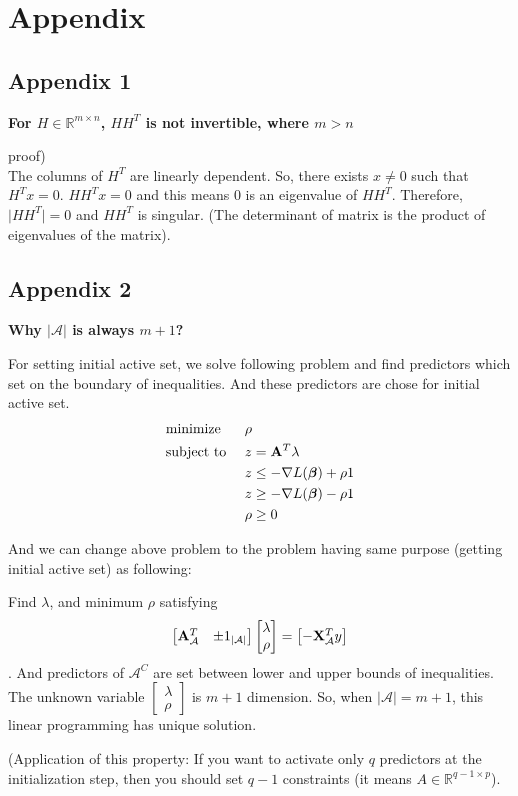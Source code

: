 \documentclass{article}
\newcommand{\bA}{{\bf A}}
\newcommand{\bX}{{\bf X}}
\newcommand{\bbeta}{\mbox{\boldmath{$\beta$}}}
\newcommand{\bean}{\begin{eqnarray*}}
\newcommand{\eean}{\end{eqnarray*}}
\newcommand{\bea}{\begin{eqnarray}}
\newcommand{\eea}{\end{eqnarray}}
\begin{document}
\section{Appendix}
\subsection{Appendix 1}
\textbf{For $H \in \mathbb{R}^{m \times n}$, $H H^T$ is not invertible, where $m > n$}

\medskip
proof) \\
The columns of $H^T$ are linearly dependent. 
So, there exists $x \neq 0$ such that $H^T x = 0$.
$H H^T x = 0$ and this means 0 is an eigenvalue of $H H^T$.
Therefore, $\lvert H H^T \rvert = 0$ and $H H^T$ is singular.
(The determinant of matrix is the product of eigenvalues of the matrix).

\subsection{Appendix 2}
\textbf{Why $|\mathcal{A}|$ is always $m + 1$?} 

\medskip
For setting initial active set, we solve following problem and find predictors which set on the boundary of inequalities. And these predictors are chose for initial active set.
\bea
\begin{aligned}
    &\text{minimize} && \rho \\
    &\text{subject to } && z = \bA^T \lambda \\
    & && z \leq -\nabla L(\bbeta) + \rho 1 \\
    & && z \geq -\nabla L(\bbeta) - \rho 1 \\
    & && \rho \geq 0
\end{aligned}
\eea

And we can change above problem to the problem having same purpose (getting initial active set) as following: 

\medskip
Find $\lambda$, and minimum $\rho$ satisfying
\bean
\begin{bmatrix}
\bA_{\mathcal{A}}^T & \pm 1_{|\mathcal{A}|}
\end{bmatrix}
\begin{bmatrix}
\lambda \\
\rho
\end{bmatrix}
=
\begin{bmatrix}
- \bX_{\mathcal{A}}^T y
\end{bmatrix}
\eean.
And predictors of $\mathcal{A}^C$ are set between lower and upper bounds of inequalities.
The unknown variable $\begin{bmatrix} \lambda \\ \rho \end{bmatrix}$ is $m + 1$ dimension.
So, when $|\mathcal{A}| = m + 1$, this linear programming has unique solution.

\medskip
(Application of this property: If you want to activate only $q$ predictors at the initialization step, then you should set $q-1$ constraints (it means $A \in \mathbb{R}^{q-1 \times p}$).
\end{document}
